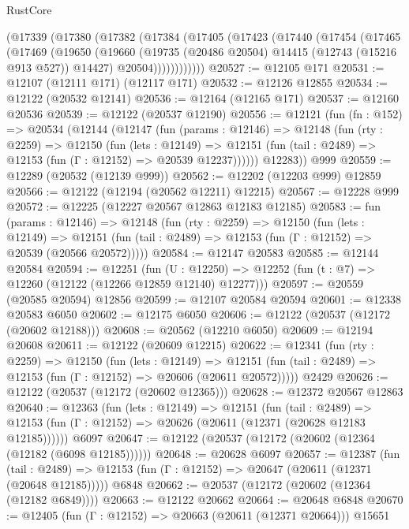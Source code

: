 \begin{lexlean}{RustCore}
\begin{coremodule}
    (@17339
      (@17380
        (@17382
          (@17384
            (@17405
              (@17423
                (@17440
                  (@17454
                    (@17465
                      (@17469
                        (@19650
                          (@19660
                            (@19735 (@20486 @20504) @14415 (@12743 (@15216 @913 @527)) @14427)
                            @20504))))))))))))
@20527 := @12105 @171
@20531 := @12107 (@12111 @171) (@12117 @171)
@20532 := @12126 @12855
@20534 := @12122 (@20532 @12141)
@20536 := @12164 (@12165 @171)
@20537 := @12160 @20536
@20539 := @12122 (@20537 @12190)
@20556 := @12121
    (fun (fn : @152) =>
    @20534
      (@12144
        (@12147
          (fun (params : @12146) =>
          @12148
            (fun (rty : @2259) =>
            @12150
              (fun (lets : @12149) =>
              @12151 (fun (tail : @2489) => @12153 (fun (Γ : @12152) => @20539 @12237))))))
        @12283))
    @999
@20559 := @12289 (@20532 (@12139 @999))
@20562 := @12202 (@12203 @999) @12859
@20566 := @12122 (@12194 (@20562 @12211) @12215)
@20567 := @12228 @999
@20572 := @12225 (@12227 @20567 @12863 @12183 @12185)
@20583 := fun (params : @12146) =>
  @12148
    (fun (rty : @2259) =>
    @12150
      (fun (lets : @12149) =>
      @12151 (fun (tail : @2489) => @12153 (fun (Γ : @12152) => @20539 (@20566 @20572)))))
@20584 := @12147 @20583
@20585 := @12144 @20584
@20594 := @12251
    (fun (U : @12250) => @12252 (fun (t : @7) => @12260 (@12122 (@12266 @12859 @12140) @12277)))
@20597 := @20559 (@20585 @20594) @12856
@20599 := @12107 @20584 @20594
@20601 := @12338 @20583 @6050
@20602 := @12175 @6050
@20606 := @12122 (@20537 (@12172 (@20602 @12188)))
@20608 := @20562 (@12210 @6050)
@20609 := @12194 @20608
@20611 := @12122 (@20609 @12215)
@20622 := @12341
    (fun (rty : @2259) =>
    @12150
      (fun (lets : @12149) =>
      @12151 (fun (tail : @2489) => @12153 (fun (Γ : @12152) => @20606 (@20611 @20572)))))
    @2429
@20626 := @12122 (@20537 (@12172 (@20602 @12365)))
@20628 := @12372 @20567 @12863
@20640 := @12363
    (fun (lets : @12149) =>
    @12151
      (fun (tail : @2489) =>
      @12153 (fun (Γ : @12152) => @20626 (@20611 (@12371 (@20628 @12183 @12185))))))
    @6097
@20647 := @12122 (@20537 (@12172 (@20602 (@12364 (@12182 (@6098 @12185))))))
@20648 := @20628 @6097
@20657 := @12387
    (fun (tail : @2489) => @12153 (fun (Γ : @12152) => @20647 (@20611 (@12371 (@20648 @12185)))))
    @6848
@20662 := @20537 (@12172 (@20602 (@12364 (@12182 @6849))))
@20663 := @12122 @20662
@20664 := @20648 @6848
@20670 := @12405 (fun (Γ : @12152) => @20663 (@20611 (@12371 @20664))) @15651

\end{coremodule}
\end{lexlean}
